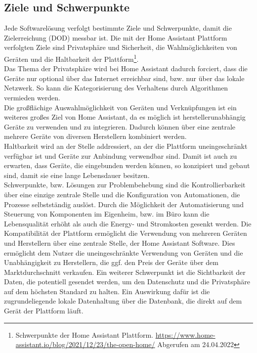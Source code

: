 \subsection{Ziele und Schwerpunkte}
    Jede Softwarelösung verfolgt bestimmte Ziele und Schwerpunkte, damit die Zielerreichung (\ac{DOD}) messbar ist. Die mit 
    der Home Assistant Plattform verfolgten Ziele sind Privatsphäre und Sicherheit, die Wahlmöglichkeiten von Geräten und die Haltbarkeit 
    der Plattform\footnote{Schwerpunkte der Home Assistant Plattform. \url{https://www.home-assistant.io/blog/2021/12/23/the-open-home/} Abgerufen am 24.04.2022}. 
    \\
    \linebreak
    Das Thema der Privatsphäre wird bei Home Assistant dadurch forciert, dass die Geräte nur optional über das Internet erreichbar sind, bzw. 
    nur über das lokale Netzwerk. So kann die Kategorisierung des Verhaltens durch Algorithmen vermieden werden. 
    \\
    Die großflächige Auswahlmöglichkeit von Geräten und Verknüpfungen ist ein weiteres großes Ziel von Home Assistant, da es möglich ist  
    herstellerunabhängig Geräte zu verwenden und zu integrieren. Dadurch können über eine zentrale mehrere Geräte von diversen Herstellern 
    kombiniert werden.
    \\
    Haltbarkeit wird an der Stelle addressiert, an der die Plattform uneingeschränkt verfügbar ist und Geräte zur Anbindung verwendbar sind. 
    Damit ist auch zu erwarten, dass Geräte, die eingebunden werden können, so konzipiert und gebaut sind, damit sie eine lange Lebensdauer 
    besitzen.
    \\
    \linebreak
    Schwerpunkte, bzw. Lösungen zur Problembehebung sind die Kontrollierbarkeit über eine einzige zentrale Stelle und die Konfiguration von 
    Automationen, die Prozesse selbstständig auslöst. Durch die Möglichkeit der Automatisierung und Steuerung von Komponenten im Eigenheim, 
    bzw. im Büro kann die Lebensqualität erhöht als auch die Energy- und Stromkosten gesenkt werden. Die Kompatibilität der Plattform 
    ermöglicht die Verwendung von mehreren Geräten und Herstellern über eine zentrale Stelle, der Home Assistant Software. Dies ermöglicht 
    dem Nutzer die uneingeschränkte Verwendung von Geräten und die Unabhängigkeit zu Herstellern, die ggf. den Preis der Geräte über dem 
    Marktdurchschnitt verkaufen. Ein weiterer Schwerpunkt ist die Sichtbarkeit der Daten, die potentiell gesendet werden, um den Datenschutz 
    und die Privatsphäre auf dem höchsten Standard zu halten. Ein Auswirkung dafür ist die zugrundeliegende lokale Datenhaltung über die 
    Datenbank, die direkt auf dem Gerät der Plattform läuft.

